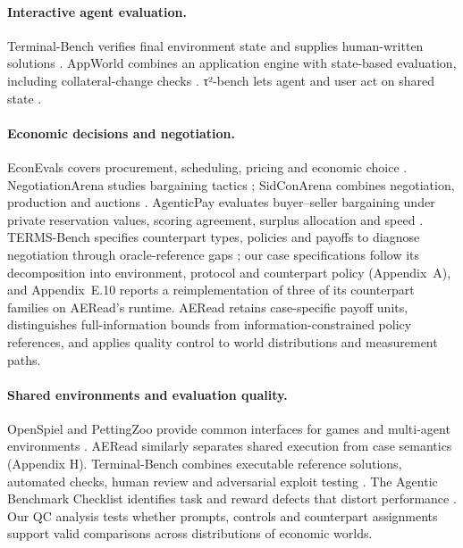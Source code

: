 \paragraph{Interactive agent evaluation.}
Terminal-Bench verifies final environment state and supplies human-written
solutions \citep{merrill2026terminalbench}. AppWorld combines an application
engine with state-based evaluation, including collateral-change checks
\citep{trivedi2024appworld}. τ²-bench lets agent and user act on shared
state \citep{barres2025tau2}.

\paragraph{Economic decisions and negotiation.}
EconEvals covers procurement, scheduling, pricing and economic choice
\citep{fish2025econevals}. NegotiationArena studies bargaining tactics
\citep{bianchi2024negotiationarena}; SidConArena combines negotiation,
production and auctions \citep{feng2026sidconarena}. AgenticPay evaluates
buyer--seller bargaining under private reservation values, scoring
agreement, surplus allocation and speed \citep{liu2026agenticpay}.
TERMS-Bench specifies counterpart types, policies and payoffs to diagnose
negotiation through oracle-reference gaps \citep{zhang2026termsbench}; our
case specifications follow its decomposition into environment, protocol
and counterpart policy (Appendix~A), and Appendix~E.10 reports a
reimplementation of three of its counterpart families on AERead's runtime.
AERead retains case-specific payoff units, distinguishes full-information
bounds from information-constrained policy references, and applies quality control to world
distributions and measurement paths.

\paragraph{Shared environments and evaluation quality.}
OpenSpiel and PettingZoo provide common interfaces for games and
multi-agent environments \citep{lanctot2019openspiel,terry2021pettingzoo}.
AERead similarly separates shared execution from case semantics
(Appendix H). Terminal-Bench combines executable reference solutions,
automated checks, human review and adversarial exploit testing
\citep{merrill2026terminalbench}. The Agentic Benchmark Checklist
identifies task and reward defects that distort performance
\citep{zhu2025abc}. Our QC analysis tests whether prompts, controls and
counterpart assignments support valid comparisons across distributions
of economic worlds.


